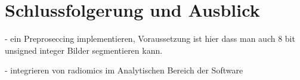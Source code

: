 \chapter{Schlussfolgerung und Ausblick}
\label{chap:schlussfolgerung}

- ein Preproseccing implementieren, Voraussetzung ist hier dass man auch 8 bit unsigned
integer Bilder segmentieren kann.

- integrieren von radiomics im Analytischen Bereich der Software